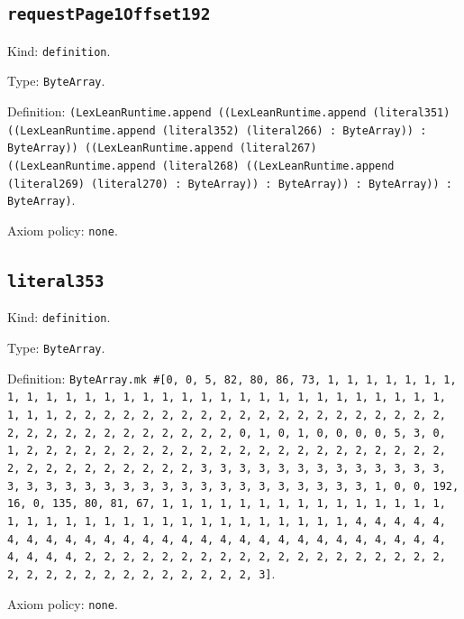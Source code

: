 \documentclass[11pt]{article}
\begin{document}
\subsection*{\texttt{requestPage1Offset192}}
\noindent Kind: \texttt{definition}.\par
\noindent Type: \texttt{ByteArray}.\par
\noindent Definition: \texttt{(LexLeanRuntime.append ((LexLeanRuntime.append (literal351) ((LexLeanRuntime.append (literal352) (literal266) : ByteArray)) : ByteArray)) ((LexLeanRuntime.append (literal267) ((LexLeanRuntime.append (literal268) ((LexLeanRuntime.append (literal269) (literal270) : ByteArray)) : ByteArray)) : ByteArray)) : ByteArray)}.\par
\noindent Axiom policy: \texttt{none}.\par
\subsection*{\texttt{literal353}}
\noindent Kind: \texttt{definition}.\par
\noindent Type: \texttt{ByteArray}.\par
\noindent Definition: \texttt{ByteArray.mk \#[0, 0, 5, 82, 80, 86, 73, 1, 1, 1, 1, 1, 1, 1, 1, 1, 1, 1, 1, 1, 1, 1, 1, 1, 1, 1, 1, 1, 1, 1, 1, 1, 1, 1, 1, 1, 1, 1, 1, 1, 2, 2, 2, 2, 2, 2, 2, 2, 2, 2, 2, 2, 2, 2, 2, 2, 2, 2, 2, 2, 2, 2, 2, 2, 2, 2, 2, 2, 2, 2, 2, 2, 0, 1, 0, 1, 0, 0, 0, 0, 5, 3, 0, 1, 2, 2, 2, 2, 2, 2, 2, 2, 2, 2, 2, 2, 2, 2, 2, 2, 2, 2, 2, 2, 2, 2, 2, 2, 2, 2, 2, 2, 2, 2, 2, 2, 3, 3, 3, 3, 3, 3, 3, 3, 3, 3, 3, 3, 3, 3, 3, 3, 3, 3, 3, 3, 3, 3, 3, 3, 3, 3, 3, 3, 3, 3, 3, 3, 1, 0, 0, 192, 16, 0, 135, 80, 81, 67, 1, 1, 1, 1, 1, 1, 1, 1, 1, 1, 1, 1, 1, 1, 1, 1, 1, 1, 1, 1, 1, 1, 1, 1, 1, 1, 1, 1, 1, 1, 1, 1, 1, 4, 4, 4, 4, 4, 4, 4, 4, 4, 4, 4, 4, 4, 4, 4, 4, 4, 4, 4, 4, 4, 4, 4, 4, 4, 4, 4, 4, 4, 4, 4, 4, 2, 2, 2, 2, 2, 2, 2, 2, 2, 2, 2, 2, 2, 2, 2, 2, 2, 2, 2, 2, 2, 2, 2, 2, 2, 2, 2, 2, 2, 2, 2, 2, 3]}.\par
\noindent Axiom policy: \texttt{none}.\par
\end{document}
